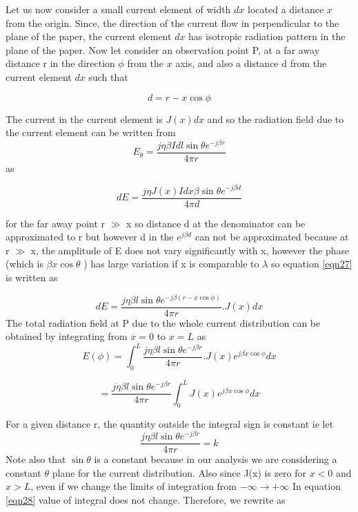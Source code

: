 Let us now consider a small current element of width $dx$ located a distance $x$ from the origin. Since, the direction of the current flow in perpendicular to the plane of the paper, the current element $dx$ has isotropic radiation pattern in the plane of the paper. Now let consider an observation  point P, at a far away distance r in the direction $\phi$ from the $x$ axis, and also a distance d from the current element $dx$ such that

$$d= r- x\cos\phi$$

The  current in the current element is $J(x)dx$ and so the radiation field due to the current element can be written from $$ E_\theta = \dfrac{j\eta\beta Idl\sin\theta e^{-j\beta r}}{4\pi r} $$
as

\begin{equation}
dE = \dfrac{j\eta J(x) Idx\beta\sin\theta e^{-j\beta d}}{4\pi d}
\label{eqn27}
\end{equation} 

for the far away point r $\gg$ x so distance d at the denominator can  be approximated to r but however d in the $ e^{j\beta d}$ can not be approximated because at r $\gg$ x, the amplitude of E does not vary significantly with x, however the phase (which is  $\beta x\cos\theta$ ) has large variation if x is comparable to $\lambda$  so equation \ref{eqn27} is written as

$$ dE = \dfrac{j\eta\beta l\sin\theta e^{-j\beta (r-x\cos\phi)}}{4\pi r}.J(x)dx $$
The  total radiation field at P due to the whole current distribution can be obtained by integrating from  $x = 0$ to $x = L$ as 
$$ E(\phi) = \int_{0}^{L}\dfrac{j\eta\beta l\sin\theta e^{-j\beta r}}{4\pi r}. J(x) e^{j\beta x\cos\phi}dx $$  

\begin{equation}
= \dfrac{j\eta\beta l\sin\theta e^{-j\beta r}}{4\pi r}\int_{0}^{L} J(x) e^{j\beta x \cos\phi}dx
\label{eqn28}
\end{equation} 

For a given distance r, the quantity outside the  integral sign is constant ie let $$ \dfrac{j\eta\beta l\sin\theta e^{-j\beta r}}{4\pi r} = k $$
Note also that $\sin\theta$ is a constant because in our analysis we are considering a constant $\theta$ plane for the current distribution.
Also since J(x) is zero for $x < 0$ and $x >L$, even if we change the limits of integration from $ -\infty\to +\infty$ In equation \ref{eqn28}  value of integral does not change. Therefore, we rewrite as 

